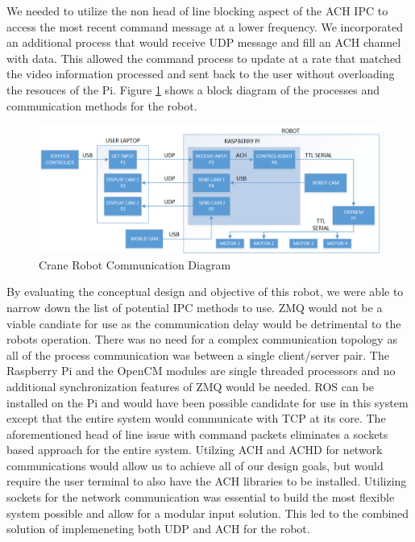We needed to utilize the non head of line blocking aspect of the ACH IPC to access the most recent command message at a lower frequency. We incorporated an additional process that would receive UDP message and fill an ACH channel with data. This allowed the command process to update at a rate that matched the video information processed and sent back to the user without overloading the resouces of the Pi. Figure \ref{fig:cranebot block} shows a block diagram of the processes and communication methods for the robot.

\begin{figure}[thpb]
 \centering
 \includegraphics[width=1.0\columnwidth]{./images/cranebot2.png}
  \caption{Crane Robot Communication Diagram}
  \label{fig:cranebot block}
\end{figure} 

By evaluating the conceptual design and objective of this robot, we were able to narrow down the list of potential IPC methods to use. ZMQ would not be a viable candiate for use as the communication delay would be detrimental to the robots operation. There was no need for a complex communication topology as all of the process communication was between a single client/server pair. The Raspberry Pi and the OpenCM modules are single threaded processors and no additional synchronization features of ZMQ would be needed. ROS can be installed on the Pi and would have been possible candidate for use in this system except that the entire system would communicate with TCP at its core. The aforementioned head of line issue with command packets eliminates a sockets based approach for the entire system. Utilzing ACH and ACHD for network communications would allow us to achieve all of our design goals, but would require the user terminal to also have the ACH libraries to be installed. Utilizing sockets for the network communication was essential to build the most flexible system possible and allow for a modular input solution. This led to the combined solution of implemeneting both UDP and ACH for the robot. 
